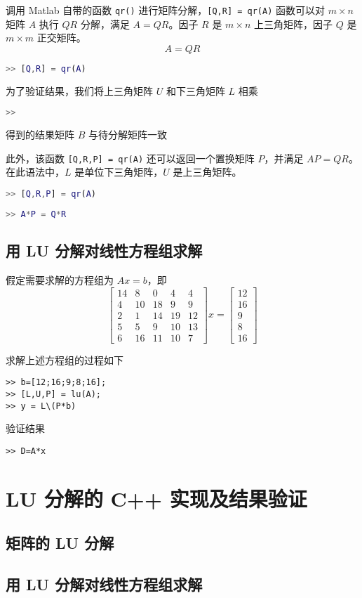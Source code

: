 调用 Matlab 自带的函数 \lstinline|qr()| 进行矩阵分解，\lstinline|[Q,R] = qr(A)| 函数可以对 $m\times n$ 矩阵 $A$ 执行 $QR$ 分解，满足 $A = QR$。因子 $R$ 是 $m×n$ 上三角矩阵，因子 $Q$ 是 $m\times m$ 正交矩阵。
\begin{equation}
    A = QR
\end{equation}

\begin{lstlisting}[language=Matlab]  
>> [Q,R] = qr(A)
\end{lstlisting}

为了验证结果，我们将上三角矩阵 $U$ 和下三角矩阵 $L$ 相乘
\begin{lstlisting}[language=Matlab]  
>> 
\end{lstlisting}
得到的结果矩阵 $B$ 与待分解矩阵一致


此外，该函数 \lstinline|[Q,R,P] = qr(A)| 还可以返回一个置换矩阵 $P$，并满足 $AP = QR$。在此语法中，$L$ 是单位下三角矩阵，$U$ 是上三角矩阵。
\begin{lstlisting}[language=Matlab]  
>> [Q,R,P] = qr(A)
\end{lstlisting}

\begin{lstlisting}[language=Matlab]  
>> A*P = Q*R
\end{lstlisting}


\subsection{用 LU 分解对线性方程组求解}
假定需要求解的方程组为 $Ax=b$，即
\begin{equation}
    \begin{bmatrix}
        14 & 8  & 0  & 4  & 4  \\
        4  & 10 & 18 & 9  & 9  \\
        2  & 1  & 14 & 19 & 12 \\
        5  & 5  & 9  & 10 & 13 \\
        6  & 16 & 11 & 10 & 7
    \end{bmatrix}
    x = 
    \begin{bmatrix}
        12 \\ 16 \\ 9 \\ 8 \\ 16
    \end{bmatrix}
\end{equation}

求解上述方程组的过程如下
\begin{lstlisting}
>> b=[12;16;9;8;16];
>> [L,U,P] = lu(A);
>> y = L\(P*b)
\end{lstlisting}

验证结果
\begin{lstlisting}
>> D=A*x
\end{lstlisting}


\section{LU 分解的 C++ 实现及结果验证}
\subsection{矩阵的 LU 分解}
\subsection{用 LU 分解对线性方程组求解}